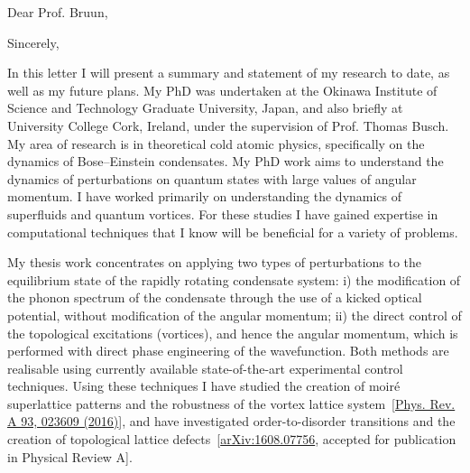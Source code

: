 \documentclass[12pt,a4paper,unicode]{moderncv}
\begin{document}
    \opening{Dear Prof. Bruun,}
    \date{\today} %
    \closing{Sincerely,}
    \makelettertitle
{
    In this letter I will present a summary and statement of my research to date, as well as my future plans. My PhD was undertaken at the Okinawa Institute of Science and Technology Graduate University, Japan, and also briefly at University College Cork, Ireland, under the supervision of Prof. Thomas Busch. My area of research is in theoretical cold atomic physics, specifically on the dynamics of Bose--Einstein condensates. My PhD work aims to understand the dynamics of perturbations on quantum states with large values of angular momentum. I have worked primarily on understanding the dynamics of superfluids and quantum vortices. For these studies I have gained expertise in computational techniques that I know will be beneficial for a variety of problems.

    My thesis work concentrates on applying two types of perturbations to the equilibrium state of the rapidly rotating condensate system: i) the modification of the phonon spectrum of the condensate through the use of a kicked optical potential, without modification of the angular momentum; ii) the direct control of the topological excitations (vortices), and hence the angular momentum, which is performed with direct phase engineering of the wavefunction. Both methods are realisable using currently available state-of-the-art experimental control techniques. Using these techniques I have studied the creation of moir\'e superlattice patterns and the robustness of the vortex lattice system~[\href{http://journals.aps.org/pra/abstract/10.1103/PhysRevA.93.023609}{Phys. Rev. A 93, 023609 (2016)}], and have investigated order-to-disorder transitions and the creation of topological lattice defects~[\href{https://arxiv.org/abs/1608.07756}{arXiv:1608.07756}, accepted for publication in Physical Review A].


}
\end{document}
